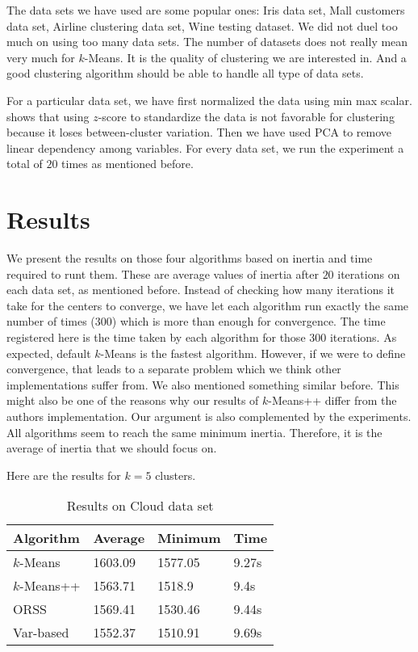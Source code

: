 \documentclass[twoside, 11pt]{article}
\begin{document}
	The data sets we have used are some popular ones: Iris data set, Mall customers data set, Airline clustering data set, Wine testing dataset. We did not duel too much on using too many data sets. The number of datasets does not really mean very much for $k$-Means. It is the quality of clustering we are interested in. And a good clustering algorithm should be able to handle all type of data sets.
	
	For a particular data set, we have first normalized the data using min max scalar. \cite{miligan} shows that using $z$-score to standardize the data is not favorable for clustering because it loses between-cluster variation. Then we have used PCA to remove linear dependency among variables. For every data set, we run the experiment a total of $20$ times as mentioned before.
	\section{Results}
	We present the results on those four algorithms based on inertia and time required to runt them. These are average values of inertia after $20$ iterations on each data set, as mentioned before. Instead of checking how many iterations it take for the centers to converge, we have let each algorithm run exactly the same number of times ($300$) which is more than enough for convergence. The time registered here is the time taken by each algorithm for those $300$ iterations. As expected, default $k$-Means is the fastest algorithm. However, if we were to define convergence, that leads to a separate problem which we think other implementations suffer from. We also mentioned something similar before. This might also be one of the reasons why our results of $k$-Means++ differ from the authors implementation. Our argument is also complemented by the experiments. All algorithms seem to reach the same minimum inertia. Therefore, it is the average of inertia that we should focus on.
	
	Here are the results for $k=5$ clusters.
		\begin{table}
			\begin{center}
				\begin{tabular}{|l|l|l|l|}
					\hline
					Algorithm & Average & Minimum & Time\\\hline
					$k$-Means & 1603.09& 1577.05& 9.27s\\\hline
					$k$-Means++ & 1563.71& 1518.9& 9.4s\\\hline
					ORSS & 1569.41& 1530.46& 9.44s\\\hline
					Var-based & 1552.37& 1510.91& 9.69s\\\hline
				\end{tabular}
			\caption{Results on Cloud data set}
			\end{center}
		\label{tbl:cloud}
		\end{table}
	
\end{document}
